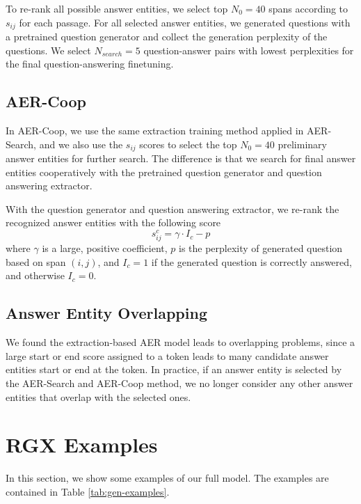 \documentclass[11pt,a4paper]{article}
\begin{document}
To re-rank all possible answer entities, we select top $N_0 = 40$ spans according to $s_{ij}$ for each passage. For all selected answer entities, we generated questions with a pretrained question generator and collect the generation perplexity of the questions. We select $N_{search} = 5$ question-answer pairs with lowest perplexities for the final question-answering finetuning.

\subsection{AER-Coop}
In AER-Coop, we use the same extraction training method applied in AER-Search, and we also use the $s_{ij}$ scores to select the top $N_0 = 40$ preliminary answer entities for further search. The difference is that we search for final answer entities cooperatively with the pretrained question generator and question answering extractor.

With the question generator and question answering extractor, we re-rank the recognized answer entities with the following score
\begin{equation}
s_{ij}^c = \gamma \cdot I_c - p
\end{equation}
where $\gamma$ is a large, positive coefficient, $p$ is the perplexity of generated question based on span $(i, j)$, and $I_c = 1$ if the generated question is correctly answered, and otherwise $I_c = 0$.

\subsection{Answer Entity Overlapping}
We found the extraction-based AER model leads to overlapping problems, since a large start or end score assigned to a token leads to many candidate answer entities start or end at the token. In practice, if an answer entity is selected by the AER-Search and AER-Coop method, we no longer consider any other answer entities that overlap with the selected ones.

\section{RGX Examples}
\label{sec:examples}
In this section, we show some examples of our full model. The examples are contained in Table \ref{tab:gen-examples}.
\end{document}
